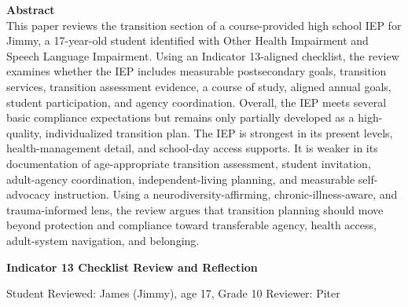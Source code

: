 \documentclass[11pt]{article}
\begin{document}
\begin{titlepage}
\begin{center}
\begin{minipage}{0.9\textwidth}
\textbf{Abstract}\\[-0.03in]
\small
This paper reviews the transition section of a course-provided high school IEP for Jimmy, a 17-year-old student identified with Other Health Impairment and Speech Language Impairment. Using an Indicator 13-aligned checklist, the review examines whether the IEP includes measurable postsecondary goals, transition services, transition assessment evidence, a course of study, aligned annual goals, student participation, and agency coordination. Overall, the IEP meets several basic compliance expectations but remains only partially developed as a high-quality, individualized transition plan. The IEP is strongest in its present levels, health-management detail, and school-day access supports. It is weaker in its documentation of age-appropriate transition assessment, student invitation, adult-agency coordination, independent-living planning, and measurable self-advocacy instruction. Using a neurodiversity-affirming, chronic-illness-aware, and trauma-informed lens, the review argues that transition planning should move beyond protection and compliance toward transferable agency, health access, adult-system navigation, and belonging.
\end{minipage}
\end{center}

\restoregeometry
\end{titlepage}
\clearpage

{\LARGE\bfseries\color{PrimaryRed} Indicator 13 Checklist Review and Reflection\par}
{\normalsize Student Reviewed: James (Jimmy), age 17, Grade 10 \hfill Reviewer: Piter\par}

\begin{center}
\end{center}
\end{document}
